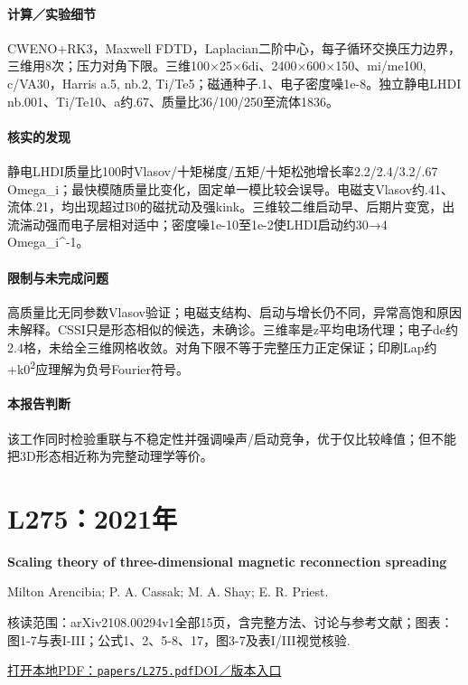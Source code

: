 \paragraph{计算／实验细节}CWENO+RK3，Maxwell FDTD，Laplacian二阶中心，每子循环交换压力边界，三维用8次；压力对角下限。三维100×25×6di、2400×600×150、mi/me100, c/VA30，Harris a.5, nb.2, Ti/Te5；磁通种子.1、电子密度噪1e-8。独立静电LHDI nb.001、Ti/Te10、a约.67、质量比36/100/250至流体1836。

\paragraph{核实的发现}静电LHDI质量比100时Vlasov/十矩梯度/五矩/十矩松弛增长率2.2/2.4/3.2/.67 Omega\_i；最快模随质量比变化，固定单一模比较会误导。电磁支Vlasov约.41、流体.21，均出现超过B0的磁扰动及强kink。三维较二维启动早、后期片变宽，出流湍动强而电子层相对适中；密度噪1e-10至1e-2使LHDI启动约30→4 Omega\_i\textasciicircum{}-1。

\paragraph{限制与未完成问题}高质量比无同参数Vlasov验证；电磁支结构、启动与增长仍不同，异常高饱和原因未解释。CSSI只是形态相似的候选，未确诊。三维率是z平均电场代理；电子de约2.4格，未给全三维网格收敛。对角下限不等于完整压力正定保证；印刷Lap约+k0\textsuperscript{2}应理解为负号Fourier符号。

\paragraph{本报告判断}该工作同时检验重联与不稳定性并强调噪声/启动竞争，优于仅比较峰值；但不能把3D形态相近称为完整动理学等价。

\section{L275：2021年}\label{paper:L275}

\textbf{Scaling theory of three-dimensional magnetic reconnection spreading}\citep{L275}\

Milton Arencibia;  P. A. Cassak;  M. A. Shay;  E. R. Priest.

\textsf{核读范围：}arXiv2108.00294v1全部15页，含完整方法、讨论与参考文献；\textsf{图表：}图1-7与表I-III；公式1、2、5-8、17，图3-7及表I/III视觉核验.

\href{run:papers/L275.pdf}{打开本地PDF：\texttt{papers/L275.pdf}}\quad\href{https://doi.org/10.1063/5.0052189}{DOI／版本入口}

